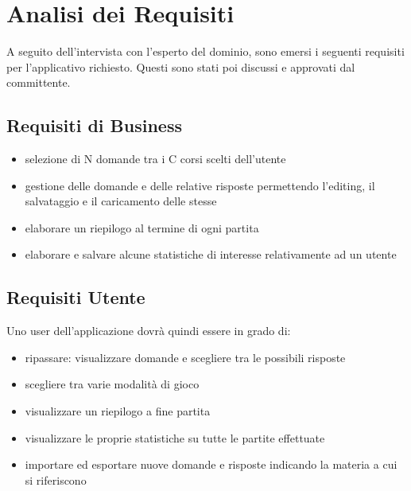 

\chapter{Analisi dei Requisiti}
A seguito dell'intervista con l'esperto del dominio, sono emersi i seguenti requisiti per l'applicativo richiesto. Questi sono stati poi discussi e approvati dal committente.
	\section{Requisiti di Business}
	\begin{itemize}
        \item selezione di N domande tra i C corsi scelti dell'utente
        \item gestione delle domande e delle relative risposte permettendo l'editing, il salvataggio e il caricamento delle stesse
        \item elaborare un riepilogo al termine di ogni partita
        \item elaborare e salvare alcune statistiche di interesse relativamente ad un utente
    \end{itemize}
	
	\section{Requisiti Utente}
    Uno user dell'applicazione dovrà quindi essere in grado di:
    \begin{itemize}
        \item ripassare: visualizzare domande e scegliere tra le possibili risposte
        \item scegliere tra varie modalità di gioco
        \item visualizzare un riepilogo a fine partita
        \item visualizzare le proprie statistiche su tutte le partite effettuate
        \item importare ed esportare nuove domande e risposte indicando la materia a cui si riferiscono
    \end{itemize}
 

